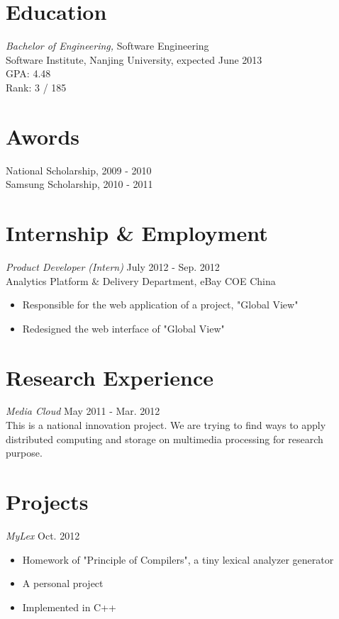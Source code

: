 \documentclass[line,margin]{res}
\begin{document}

 
\begin{resume}
 
\section{Education}
{\sl Bachelor of Engineering,} Software Engineering\\
  Software Institute, Nanjing University, expected June 2013\\
  GPA: 4.48\\
  Rank: 3 / 185

\section{Awords}
National Scholarship, 2009 - 2010 \\
Samsung Scholarship, 2010 - 2011

\section{Internship \& Employment}
{\sl Product Developer (Intern)} \hfill July 2012 - Sep. 2012\\
    Analytics Platform \& Delivery Department, eBay COE China
    \begin{itemize} \itemsep -2pt
    \item Responsible for the web application of a project, "Global View"
    \item Redesigned the web interface of "Global View"
    \end{itemize}

\section{Research Experience}
{\sl Media Cloud} \hfill May 2011 - Mar. 2012\\
This is a national innovation project. We are trying to find ways to apply
distributed computing and storage on multimedia processing for research purpose.

\section{Projects}
{\sl MyLex} \hfill Oct. 2012 
    \begin{itemize} \itemsep -2pt
    \item Homework of "Principle of Compilers", a tiny lexical analyzer
          generator
    \item A personal project
    \item Implemented in C++
    \end{itemize}


\end{resume}
\end{document}
